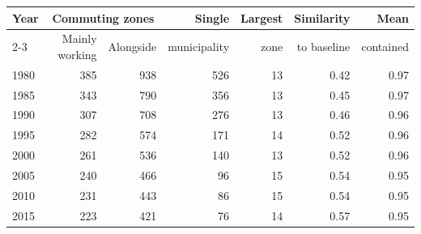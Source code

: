\begin{tabular}{lrrrrrr}
\toprule
Year & \multicolumn{2}{c}{Commuting zones} & Single & Largest & Similarity & Mean \\\cmidrule(lr){2-3} & Mainly working & Alongside & municipality & zone & to baseline & contained \\
\midrule
1980 & 385 & 938 & 526 & 13 & 0.42 & 0.97 \\
1985 & 343 & 790 & 356 & 13 & 0.45 & 0.97 \\
1990 & 307 & 708 & 276 & 13 & 0.46 & 0.96 \\
1995 & 282 & 574 & 171 & 14 & 0.52 & 0.96 \\
2000 & 261 & 536 & 140 & 13 & 0.52 & 0.96 \\
2005 & 240 & 466 & 96 & 15 & 0.54 & 0.95 \\
2010 & 231 & 443 & 86 & 15 & 0.54 & 0.95 \\
2015 & 223 & 421 & 76 & 14 & 0.57 & 0.95 \\
\bottomrule
\end{tabular}
